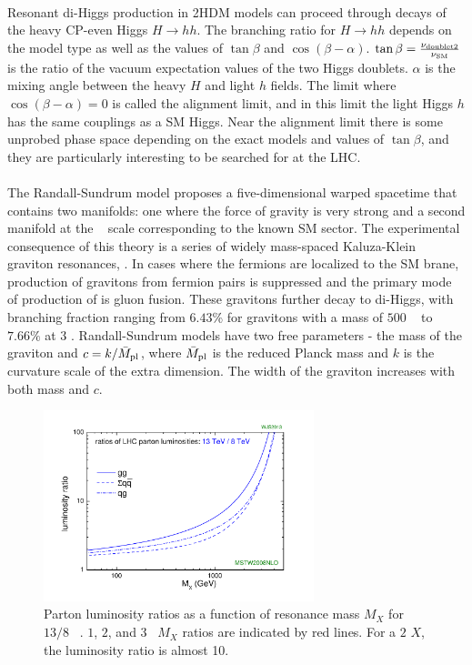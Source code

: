 \paragraph{}
Resonant di-Higgs production in 2HDM models can proceed through decays of the heavy CP-even Higgs $H\to hh$. 
The branching ratio for $H\to hh$ depends on the model type as well as the values of $\tan{\beta}$ and $\cos(\beta - \alpha)$. 
$\tan{\beta} = \frac{\rm \nu_{\rm doublet2}}{\rm \nu_{SM}}$ is the ratio of the vacuum expectation values of the two Higgs doublets. 
$\alpha$ is the mixing angle between the heavy $H$ and light $h$ fields. 
The limit where $\cos(\beta - \alpha) = 0$ is called the alignment limit, and in this limit the light Higgs $h$ has the same couplings as a SM Higgs. 
Near the alignment limit there is some unprobed phase space depending on the exact models and values of $\tan{\beta}$, and they are particularly interesting to be searched for at the LHC.

\paragraph{}
The Randall-Sundrum model proposes a five-dimensional warped spacetime that contains two manifolds: one where the force of gravity is very strong and a second manifold at the \TeV~ scale corresponding to the known SM sector.
The experimental consequence of this theory is a series of widely mass-spaced Kaluza-Klein graviton resonances, \Grav. 
In cases where the fermions are localized to the SM brane, production of gravitons from fermion pairs is suppressed and the primary mode of production of \Grav is gluon fusion. 
These gravitons further decay to di-Higgs, with branching fraction ranging from $6.43$\% for gravitons with a mass of $500$ \GeV~ to $7.66\%$ at $3$ \TeV.
Randall-Sundrum models have two free parameters - the mass of the graviton and $c = k/\bar{M}_{\rm pl}$, where $\bar{M}_{\rm pl}$ is the reduced Planck mass and $k$ is the curvature scale of the extra dimension. 
The width of the graviton increases with both mass and $c$.

\begin{figure}[htbp!]
  \centering
  \captionsetup{justification=centering}
  \includegraphics[width=0.7\textwidth]{figures/theory/lhclumi7813_2013_v1}
  \caption{Parton luminosity ratios as a function of resonance mass $M_{X}$ for $13/8$ \TeV~\cite{LumiRatio}. $1$, $2$, and $3$ ~\TeV $M_{X}$ ratios are indicated by red lines. For a $2$ \TeV $X$, the luminosity ratio is almost 10.}
  \label{fig:lumi_ratio}
\end{figure}

